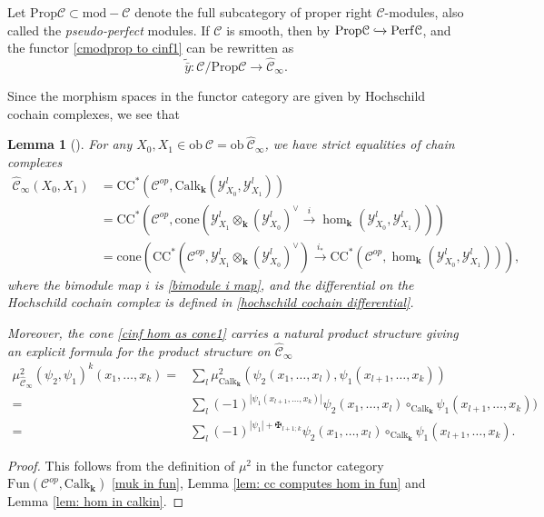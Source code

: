 \documentclass[11pt]{amsproc}
\def\K{{\mathbf{k}}}
\def\Y{\mathcal{Y}}
\def\cc{\mathcal{C}}
\def\rmod{\mathrm{mod\!-\!}}
\def\r#1{\mathrm{#1}}
\def\ob{\mathrm{ob\ }}
\def\perf{\mathrm{Perf}}
\def\calk{\mathrm{Calk}}
\def\fun{\mathrm{Fun}}
\def\cone{\mathrm{cone}}
\def\cinf{\widehat{\cc}_{\infty}}
\newtheorem{lem}{Lemma}[section]
\theoremstyle{remark}
\numberwithin{equation}{section}
\begin{document}
Let $\r{Prop} \cc \subset \rmod \cc$ denote the full subcategory of proper right $\cc$-modules,
also called the {\it pseudo-perfect} modules.
If $\cc$ is smooth,
then by \cite{toen-vaquie} $\r{Prop} \cc \xhookrightarrow{} \perf \cc$,
and the functor \eqref{cmodprop to cinf1} can be rewritten as
\begin{equation}\label{cmodprop to cinf2}
\tilde{\bar{y}}: \cc/\r{Prop} \cc \to \cinf.
\end{equation}

Since the morphism spaces in the functor category are given by Hochschild cochain complexes, 
we see that

\begin{lem}[{\cite[\S 2.4]{GGV}}]\label{lem: cinf hom as cone}
For any $X_{0}, X_{1} \in \ob \cc = \ob \cinf$, we have strict equalities of chain complexes
\begin{align}
\cinf(X_{0}, X_{1}) & = \r{CC}^{*}(\cc^{op}, \calk_{\K}(\Y^{l}_{X_{0}}, \Y^{l}_{X_{1}})) \\
& = \r{CC}^{*}(\cc^{op}, \cone(\Y^{l}_{X_{1}} \otimes_{\K} (\Y^{l}_{X_{0}})^{\vee} \stackrel{i}\to \hom_{\K}(\Y^{l}_{X_{0}}, \Y^{l}_{X_{1}}))) \label{cinf hom as cone1} \\ 
& = \cone(\r{CC}^{*}(\cc^{op}, \Y^{l}_{X_{1}} \otimes_{\K} (\Y^{l}_{X_{0}})^{\vee}) \stackrel{i_{*}}\to \r{CC}^{*}(\cc^{op}, \hom_{\K}(\Y^{l}_{X_{0}}, \Y^{l}_{X_{1}}))), \label{cinf hom as cone2}
\end{align}
where the bimodule map $i$ is \eqref{bimodule i map},
and the differential on the Hochschild cochain complex is defined in \eqref{hochschild cochain differential}.

Moreover, the cone \eqref{cinf hom as cone1} carries a natural product structure giving an explicit formula for the product structure on $\cinf$
\begin{equation}\label{mu2 on cinf}
\begin{split}
\mu_{\cinf}^{2}(\psi_{2}, \psi_{1})^{k}(x_{1}, \ldots, x_{k}) = & \sum_{l} \mu^{2}_{\calk_{\K}}( \psi_{2}(x_{1}, \ldots, x_{l}), \psi_{1}(x_{l+1}, \ldots, x_{k})) \\
=& \sum_{l} (-1)^{|\psi_{1}(x_{l+1}, \ldots, x_{k})|} \psi_{2}(x_{1}, \ldots, x_{l}) \circ_{\calk_{\K}} \psi_{1}(x_{l+1}, \ldots, x_{k})) \\
 =& \sum_{l} (-1)^{|\psi_{1}| + \maltese_{l+1; k}} \psi_{2}(x_{1}, \ldots, x_{l}) \circ_{\calk_{\K}} \psi_{1}(x_{l+1}, \ldots, x_{k}).
\end{split}
\end{equation}
\end{lem} 
\begin{proof}
This follows from the definition of $\mu^{2}$ in the functor category $\fun(\cc^{op}, \calk_{\K})$ \eqref{muk in fun}, Lemma \ref{lem: cc computes hom in fun} and Lemma \ref{lem: hom in calkin}.
\end{proof}
\end{document}
